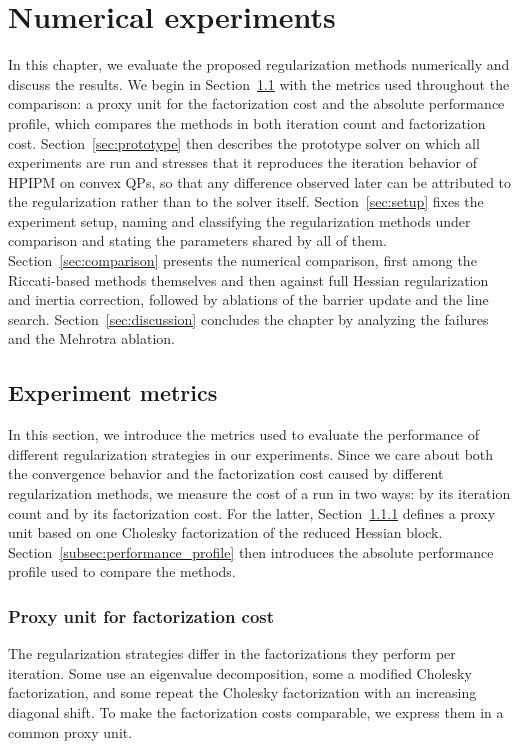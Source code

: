 \documentclass[class=scrbook, crop=false]{standalone}
\begin{document}
\chapter{Numerical experiments} %
\label{Chapter::Experiments}
In this chapter, we evaluate the proposed regularization methods numerically and discuss the results.
We begin in Section~\ref{sec:metrics} with the metrics used throughout the comparison:
a proxy unit for the factorization cost and the absolute performance profile, which compares the methods in both iteration count and factorization cost.
Section~\ref{sec:prototype} then describes the prototype solver on which all experiments are run 
and stresses that it reproduces the iteration behavior of HPIPM on convex \glspl{QP}, 
so that any difference observed later can be attributed to the regularization rather than to the solver itself.
Section~\ref{sec:setup} fixes the experiment setup, 
naming and classifying the regularization methods under comparison and stating the parameters shared by all of them.
Section~\ref{sec:comparison} presents the numerical comparison, 
first among the Riccati-based methods themselves and then against full Hessian regularization and inertia correction,
followed by ablations of the barrier update and the line search.
Section~\ref{sec:discussion} concludes the chapter by analyzing the failures and the Mehrotra ablation.

\section{Experiment metrics}
\label{sec:metrics}
In this section, we introduce the metrics used to evaluate the performance of different regularization strategies in our experiments.
Since we care about both the convergence behavior and the factorization cost caused by different regularization methods,
we measure the cost of a run in two ways: by its iteration count and by its factorization cost.
For the latter, Section~\ref{subsec:flop_unit} defines a proxy unit based on one Cholesky factorization of the reduced Hessian block.
Section~\ref{subsec:performance_profile} then introduces the absolute performance profile used to compare the methods.

\subsection{Proxy unit for factorization cost}
\label{subsec:flop_unit}
The regularization strategies differ in the factorizations they perform per iteration.
Some use an eigenvalue decomposition, some a modified Cholesky factorization,
and some repeat the Cholesky factorization with an increasing diagonal shift.
To make the factorization costs comparable, we express them in a common proxy unit.
\end{document}
